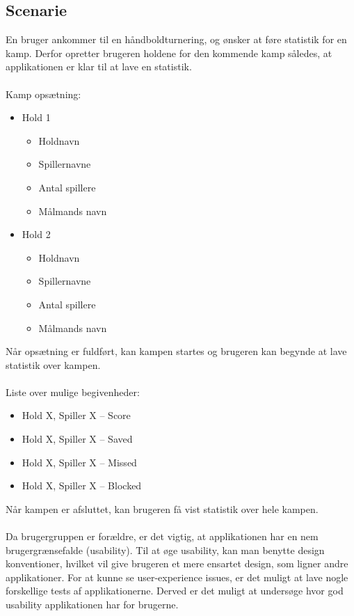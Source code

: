 \subsection*{Scenarie}
En bruger ankommer til en håndboldturnering, og ønsker at føre statistik for en kamp. Derfor opretter brugeren holdene for den kommende kamp således, at applikationen er klar til at lave en statistik.\\\\Kamp opsætning:
\begin{itemize}
\item Hold 1
	\begin{itemize}
	\item Holdnavn
	\item Spillernavne
	\item Antal spillere
	\item Målmands navn
	\end{itemize}
\item Hold 2
	\begin{itemize}
	\item Holdnavn
	\item Spillernavne
	\item Antal spillere
	\item Målmands navn\\
	\end{itemize}
\end{itemize}
Når opsætning  er fuldført, kan kampen startes og brugeren kan begynde at lave statistik over kampen.\\\\
\newpage
Liste over mulige begivenheder:
\begin{itemize}
	\item Hold X, Spiller X – Score
	\item Hold X, Spiller X – Saved
	\item Hold X, Spiller X – Missed
	\item Hold X, Spiller X – Blocked\\
\end{itemize}
Når kampen er afsluttet, kan brugeren få vist statistik over hele kampen.\\\\Da brugergruppen er forældre, er det vigtig, at applikationen har en nem brugergrænsefalde (usability). Til at øge usability, kan man benytte design konventioner, hvilket vil give brugeren et mere ensartet design, som ligner andre applikationer. For at kunne se user-experience issues, er det muligt at lave nogle forskellige tests af applikationerne. Derved er det muligt at undersøge hvor god usability applikationen har for brugerne. 

   
   
